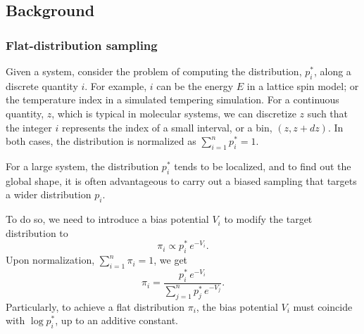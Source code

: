 \documentclass[reprint, floatfix]{revtex4-1}
\begin{document}
\subsection{\label{sec:background}
Background}



\subsubsection{\label{sec:FDS}
Flat-distribution sampling}



Given a system,
consider the problem of computing
the distribution, $p^*_i$,
along a discrete quantity $i$.
%
%
For example, $i$ can be the energy $E$
in a lattice spin model; or the temperature index
in a simulated tempering simulation.
%
For a continuous quantity, $z$,
which is typical in molecular systems,
we can discretize $z$
such that the integer $i$ represents
the index of a small interval, or a bin,
$(z, z + dz)$.
%
In both cases,
the distribution is normalized as
$\sum_{i = 1}^n p^*_i = 1$.



For a large system,
the distribution $p^*_i$ tends to
be localized,
%
and to find out the global shape,
it is often advantageous to carry out
a biased sampling that targets
a wider distribution $p_i$.
%



To do so, we need to introduce a bias potential $V_i$
to modify the target distribution to
%
\begin{equation}
  \pi_i \propto p^*_i \, e^{-V_i}.
  \label{eq:pi_p_phi1}
\end{equation}
%
Upon normalization, $\sum_{i = 1}^n \pi_i = 1$,
we get
%
\begin{equation}
  \pi_i
  =
  \frac{                p^*_i \, e^{-V_i} }
       { \sum_{j = 1}^n p^*_j \, e^{-V_j} }
  .
  \label{eq:pi_p_phi}
\end{equation}
%
Particularly,
to achieve a flat distribution $\pi_i$,
the bias potential $V_i$
must coincide with $\log p^*_i$,
up to an additive constant.
\end{document}
